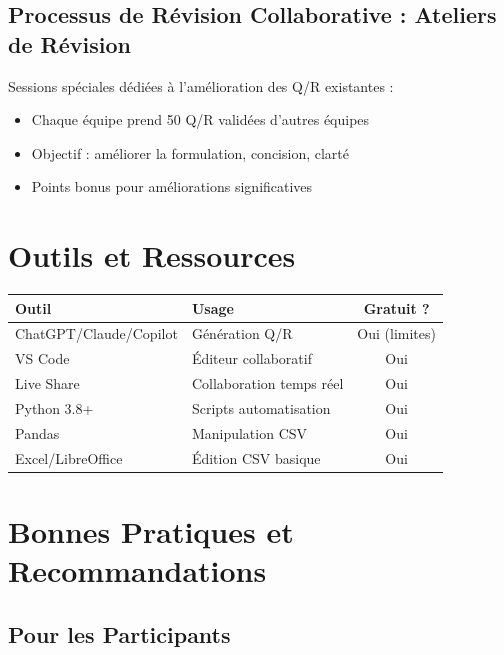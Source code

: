 \documentclass[11pt,a4paper]{article}
\begin{document}
\subsection{Processus de Révision Collaborative : Ateliers de Révision}

Sessions spéciales dédiées à l'amélioration des Q/R existantes :
\begin{itemize}
    \item Chaque équipe prend 50 Q/R validées d'autres équipes
    \item Objectif : améliorer la formulation, concision, clarté
    \item Points bonus pour améliorations significatives
\end{itemize}

\section{Outils et Ressources}
\label{sec:outils}

\begin{table}[H]
    \centering
    \begin{tabularx}{\textwidth}{|l|X|c|}
        \hline
        \textbf{Outil} & \textbf{Usage} & \textbf{Gratuit ?} \\
        \hline
        ChatGPT/Claude/Copilot & Génération Q/R & Oui (limites) \\
        \hline
        VS Code & Éditeur collaboratif & Oui \\
        \hline
        Live Share & Collaboration temps réel & Oui \\
        \hline
        Python 3.8+ & Scripts automatisation & Oui \\
        \hline
        Pandas & Manipulation CSV & Oui \\
        \hline
        Excel/LibreOffice & Édition CSV basique & Oui \\
        \hline
    \end{tabularx}
\end{table}

\section{Bonnes Pratiques et Recommandations}
\label{sec:bonnes-pratiques}

\subsection{Pour les Participants}
\end{document}
